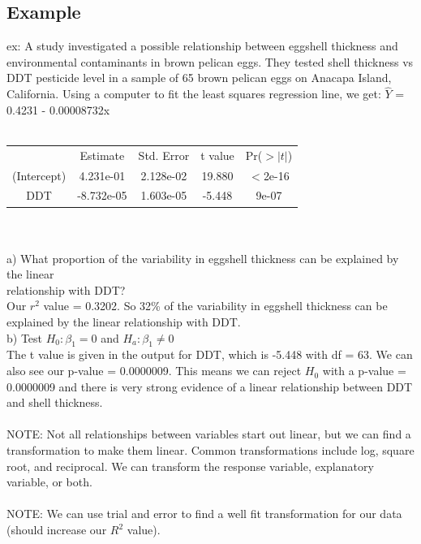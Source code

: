 \documentclass[12pt, a4paper]{article}
\begin{document}
	\subsection{Example}
	ex: A study investigated a possible relationship between eggshell thickness and environmental contaminants in brown pelican eggs. They tested shell thickness vs DDT pesticide level in a sample of 65 brown pelican eggs on Anacapa Island, California. Using a computer to fit the least squares regression line, we get: $\hat{Y}$ = 0.4231 - 0.00008732x \\~\\
	\begin{tabular}{ |c|c|c|c|c| }
		\hline
		 & Estimate & Std. Error & t value & Pr($>|t|$) \\
		(Intercept) & 4.231e-01 & 2.128e-02 & 19.880 & $<$2e-16 \\
		DDT & -8.732e-05 & 1.603e-05 & -5.448 & 9e-07 \\
		\hline
	\end{tabular} \\~\\
	a) What proportion of the variability in eggshell thickness can be explained by the linear \\ relationship with DDT? \\
	Our $r^2$ value = 0.3202. So 32\% of the variability in eggshell thickness can be explained by the linear relationship with DDT. \\
	b) Test $H_0: \beta_1 = 0$ and $H_a: \beta_1 \neq 0$ \\
	The t value is given in the output for DDT, which is -5.448 with df = 63. We can also see our p-value = 0.0000009. This means we can reject $H_0$ with a p-value = 0.0000009 and there is very strong evidence of a linear relationship between DDT and shell thickness. \\~\\
	NOTE: Not all relationships between variables start out linear, but we can find a transformation to make them linear. Common transformations include log, square root, and reciprocal. We can transform the response variable, explanatory variable, or both. \\~\\
	NOTE: We can use trial and error to find a well fit transformation for our data (should increase our $R^2$ value). \\~\\
	
\end{document}

